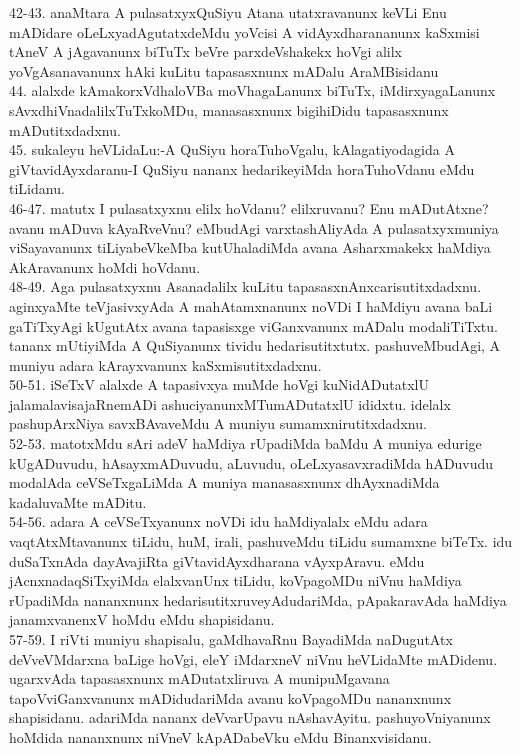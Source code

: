 \documentclass{article}
\begin{document}
42-43. anaMtara A pulasatxyxQuSiyu Atana utatxravanunx keVLi Enu mADidare oLeLxyadAgutatxdeMdu yoVcisi A vidAyxdharananunx kaSxmisi tAneV A jAgavanunx biTuTx beVre parxdeVshakekx hoVgi alilx yoVgAsanavanunx hAki kuLitu tapasasxnunx mADalu AraMBisidanu\\
44. alalxde kAmakorxVdhaloVBa moVhagaLanunx biTuTx, iMdirxyagaLanunx sAvxdhiVnadalilxTuTxkoMDu, manasasxnunx bigihiDidu tapasasxnunx mADutitxdadxnu.\\
45. sukaleyu heVLidaLu:-A QuSiyu horaTuhoVgalu, kAlagatiyodagida A giVtavidAyxdaranu-I QuSiyu nananx hedarikeyiMda horaTuhoVdanu eMdu tiLidanu.\\
46-47. matutx I pulasatxyxnu elilx hoVdanu? elilxruvanu? Enu mADutAtxne? avanu mADuva kAyaRveVnu? eMbudAgi varxtashAliyAda A pulasatxyxmuniya viSayavanunx tiLiyabeVkeMba kutUhaladiMda avana Asharxmakekx haMdiya AkAravanunx hoMdi hoVdanu.\\
48-49. Aga pulasatxyxnu Asanadalilx kuLitu tapasasxnAnxcarisutitxdadxnu. aginxyaMte teVjasivxyAda A mahAtamxnanunx noVDi I haMdiyu avana baLi gaTiTxyAgi kUgutAtx avana tapasisxge viGanxvanunx mADalu modaliTiTxtu. tananx mUtiyiMda A QuSiyanunx tividu hedarisutitxtutx. pashuveMbudAgi, A muniyu adara kArayxvanunx kaSxmisutitxdadxnu.\\
50-51. iSeTxV alalxde A tapasivxya muMde hoVgi kuNidADutatxlU jalamalavisajaRnemADi ashuciyanunxMTumADutatxlU ididxtu. idelalx pashupArxNiya savxBAvaveMdu A muniyu sumamxnirutitxdadxnu.\\
52-53. matotxMdu sAri adeV haMdiya rUpadiMda baMdu A muniya edurige kUgADuvudu, hAsayxmADuvudu, aLuvudu, oLeLxyasavxradiMda hADuvudu modalAda ceVSeTxgaLiMda A muniya manasasxnunx dhAyxnadiMda kadaluvaMte mADitu.\\
54-56. adara A ceVSeTxyanunx noVDi idu haMdiyalalx eMdu adara vaqtAtxMtavanunx tiLidu, huM, irali, pashuveMdu tiLidu sumamxne biTeTx. idu duSaTxnAda dayAvajiRta giVtavidAyxdharana vAyxpAravu. eMdu jAcnxnadaqSiTxyiMda elalxvanUnx tiLidu, koVpagoMDu niVnu haMdiya rUpadiMda nananxnunx hedarisutitxruveyAdudariMda, pApakaravAda haMdiya janamxvanenxV hoMdu eMdu shapisidanu.\\
57-59. I riVti muniyu shapisalu, gaMdhavaRnu BayadiMda naDugutAtx deVveVMdarxna baLige hoVgi, eleY iMdarxneV niVnu heVLidaMte mADidenu. ugarxvAda tapasasxnunx mADutatxliruva A munipuMgavana tapoVviGanxvanunx mADidudariMda avanu koVpagoMDu nananxnunx shapisidanu. adariMda nananx deVvarUpavu nAshavAyitu. pashuyoVniyanunx hoMdida nananxnunx niVneV kApADabeVku eMdu Binanxvisidanu.\\
\end{document}
